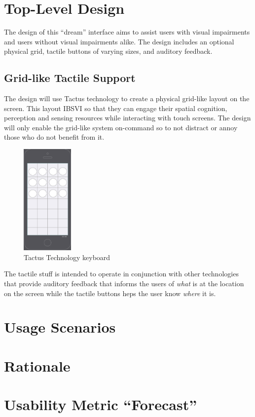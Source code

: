 \documentclass[11pt]{article}
\begin{document}
\section{Top-Level Design}
The design of this ``dream'' interface aims to assist users with visual impairments and users without visual impairments alike. The design includes an optional physical grid, tactile buttons of varying sizes, and auditory feedback. 


\subsection{Grid-like Tactile Support}
The design will use Tactus technology to create a physical grid-like layout on the screen. This layout IBSVI so that they can engage their spatial cognition, perception and sensing resources while interacting with touch screens. The design will only enable the grid-like system on-command so to not distract or annoy those who do not benefit from it.


\begin{figure}[ht]
\centering
\includegraphics[width=1in]{wireframe.png} 
\caption{Tactus Technology keyboard}
\label{tactus}
\end{figure}

The tactile stuff is intended to operate in conjunction with other technologies that provide auditory feedback that informs the users of \textit{what} is at the location on the screen while the tactile buttons heps the user know \textit{where} it is. 
\label{background}

\section{Usage Scenarios}

\section{Rationale}


\section{Usability Metric ``Forecast''}
\clearpage


{}

\end{document}
